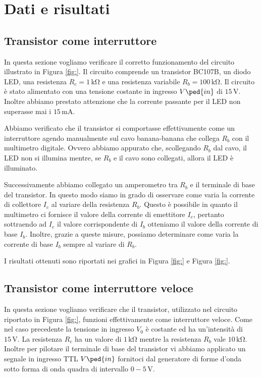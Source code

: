 \section*{Dati e risultati}

\subsection{Transistor come interruttore}

In questa sezione vogliamo verificare il corretto funzionamento del circuito illustrato in Figura \ref{fig:}.
Il circuito comprende un transistor BC107B, un diodo LED, una resistenza $R_c=1\,\si{\kilo\ohm}$ e una resistenza variabile $R_b=100\,\si{\kilo\ohm}$. Il circuito è stato alimentato con una tensione costante in ingresso $V\ped{in}$ di $15\,\si{\volt}$. Inoltre abbiamo prestato attenzione che la corrente passante per il LED non superasse mai i $15\,\si{\milli\ampere}$.

Abbiamo verificato che il transistor si comportasse effettivamente come un interruttore agendo manualmente sul cavo banana-banana che collega $R_b$ con il multimetro digitale. Ovvero abbiamo appurato che, scollegando $R_b$ dal cavo, il LED non si illumina mentre, se $R_b$ e il cavo sono collegati, allora il LED è illuminato.

Successivamente abbiamo collegato un amperometro tra $R_b$ e il terminale di base del transistor. In questo modo siamo in grado di osservare come varia la corrente di collettore $I_c$ al variare della resistenza $R_b$. Questo è possibile in quanto il multimetro ci fornisce il valore della corrente di emettitore $I_e$, pertanto sottraendo ad $I_e$ il valore corrispondente di $I_b$ otteniamo il valore della corrente di base $I_b$. Inoltre, grazie a queste misure, possiamo determinare come varia la corrente di base $I_b$ sempre al variare di $R_b$.

I risultati ottenuti sono riportati nei grafici in Figura \ref{fig:} e Figura \ref{fig:}.

\subsection{Transistor come interruttore veloce}

In questa sezione vogliamo verificare che il transistor, utilizzato nel circuito riportato in Figura \ref{fig:}, funzioni effettivamente come interruttore veloce.
Come nel caso precedente la tensione in ingresso $V_0$ è costante ed ha un'intensità di $15\,\si{\volt}$. La resistenza $R_c$ ha un valore di $1\,\si{\kilo\ohm}$ mentre la resistenza $R_b$ vale $10\,\si{\kilo\ohm}$. Inoltre per pilotare il terminale di base del transistor vi abbiamo applicato un segnale in ingresso TTL $V\ped{in}$ fornitoci dal generatore di forme d'onda sotto forma di onda quadra di intervallo $0-5\,\si{\volt}$.

